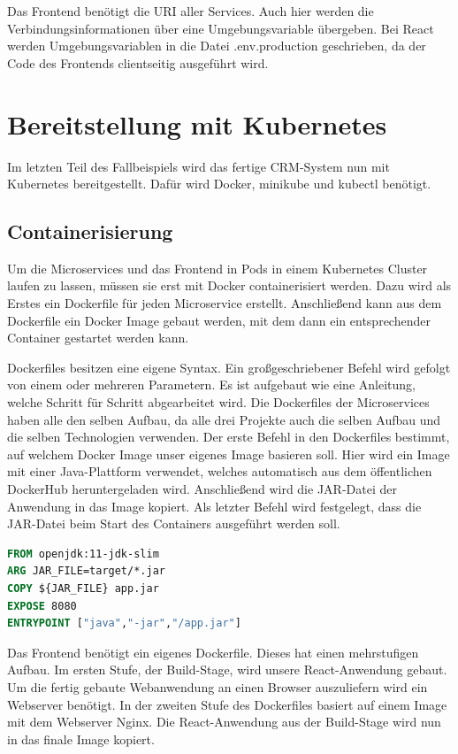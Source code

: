 Das Frontend benötigt die \ac{URI} aller Services. Auch hier werden die Verbindungsinformationen über eine Umgebungsvariable übergeben. Bei React werden Umgebungsvariablen in die Datei .env.production geschrieben, da der Code des Frontends clientseitig ausgeführt wird.

\clearpage
\section{Bereitstellung mit Kubernetes}

Im letzten Teil des Fallbeispiels wird das fertige CRM-System nun mit Kubernetes bereitgestellt. Dafür wird Docker, minikube und kubectl benötigt.

\subsection{Containerisierung}

Um die Microservices und das Frontend in Pods in einem Kubernetes Cluster laufen zu lassen, müssen sie erst mit Docker containerisiert werden. Dazu wird als Erstes ein Dockerfile für jeden Microservice erstellt. Anschließend kann aus dem Dockerfile ein Docker Image gebaut werden, mit dem dann ein entsprechender Container gestartet werden kann.

Dockerfiles besitzen eine eigene Syntax. Ein großgeschriebener Befehl wird gefolgt von einem oder mehreren Parametern. Es ist aufgebaut wie eine Anleitung, welche Schritt für Schritt abgearbeitet wird. Die Dockerfiles der Microservices haben alle den selben Aufbau, da alle drei Projekte auch die selben Aufbau und die selben Technologien verwenden. Der erste Befehl in den Dockerfiles bestimmt, auf welchem Docker Image unser eigenes Image basieren soll. Hier wird ein Image mit einer Java-Plattform verwendet, welches automatisch aus dem öffentlichen DockerHub heruntergeladen wird. Anschließend wird die JAR-Datei der Anwendung in das Image kopiert. Als letzter Befehl wird festgelegt, dass die JAR-Datei beim Start des Containers ausgeführt werden soll.

\begin{lstlisting}[language=dockerfile, caption=Dockerfile für Kontakt-Microservice]
FROM openjdk:11-jdk-slim
ARG JAR_FILE=target/*.jar
COPY ${JAR_FILE} app.jar
EXPOSE 8080
ENTRYPOINT ["java","-jar","/app.jar"]
\end{lstlisting}

Das Frontend benötigt ein eigenes Dockerfile. Dieses hat einen mehrstufigen Aufbau. Im ersten Stufe, der Build-Stage, wird unsere React-Anwendung gebaut. Um die fertig gebaute Webanwendung an einen Browser auszuliefern wird ein Webserver benötigt. In der zweiten Stufe des Dockerfiles basiert auf einem Image mit dem Webserver Nginx. Die React-Anwendung aus der Build-Stage wird nun in das finale Image kopiert.

